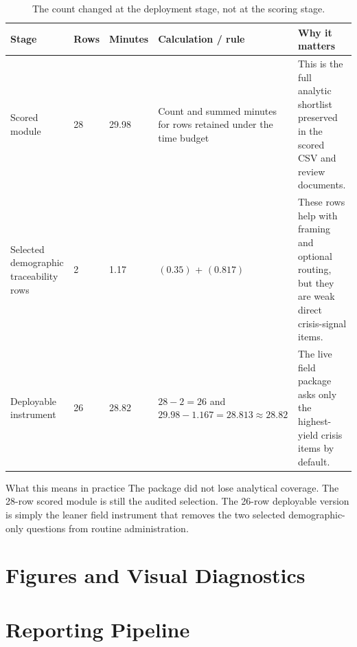 \documentclass[12pt]{article}
\begin{document}
\begin{table}[H]
\centering
\footnotesize
\begin{tabularx}{\textwidth}{L{0.20\textwidth} R{0.08\textwidth} R{0.10\textwidth} Y Y}
\toprule
Stage & Rows & Minutes & Calculation / rule & Why it matters \\
\midrule
Scored module & 28 & 29.98 & Count and summed minutes for rows retained under the time budget & This is the full analytic shortlist preserved in the scored CSV and review documents. \\
Selected demographic traceability rows & 2 & 1.17 &  $(0.35)$ +  $(0.817)$ & These rows help with framing and optional routing, but they are weak direct crisis-signal items. \\
Deployable instrument & 26 & 28.82 & $28 - 2 = 26$ and $29.98 - 1.167 = 28.813 \approx 28.82$ & The live field package asks only the highest-yield crisis items by default. \\
\bottomrule
\end{tabularx}
\caption{The count changed at the deployment stage, not at the scoring stage.}
\end{table}

\begin{psidbox}{What this means in practice}
The package did not lose analytical coverage. The 28-row scored module is still the audited selection. The 26-row deployable version is simply the leaner field instrument that removes the two selected demographic-only questions from routine administration.
\end{psidbox}

\section{Figures and Visual Diagnostics}


\section{Reporting Pipeline}
\end{document}
